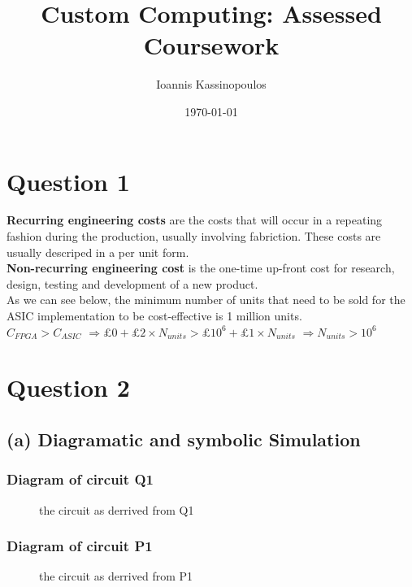 \documentclass[a4paper,10pt]{article}
\begin{document}
\title{Custom Computing: Assessed Coursework}
\author{Ioannis Kassinopoulos}
\date{\today}
\maketitle
\section*{Question 1}
\textbf{Recurring engineering costs} are the costs that will occur in a repeating fashion during the production, usually involving fabriction.
These costs are usually descriped in a per unit form.
\\[0.25cm]
\textbf{Non-recurring engineering cost} is the one-time up-front cost 
for research, design, testing and development of a new product.
\\[0.25cm]
As we can see below, the minimum number of units that need to be sold for the ASIC implementation to be cost-effective is 1 million units.
\\[0.25cm]
$C_{FPGA} > C_{ASIC}$
$\Rightarrow \pounds 0 + \pounds 2 \times N_{units} > \pounds 10^6 + \pounds 1 \times N_{units} $ 
$\Rightarrow N_{units} > 10^6$

\section*{Question 2}
\subsection*{(a) Diagramatic and symbolic Simulation}
\subsubsection*{Diagram of circuit Q1}
\begin{figure}[!h]
\begin{center}

\caption{the circuit as derrived from Q1}
\end{center}
\end{figure}
\subsubsection*{Diagram of circuit P1}
\begin{figure}[!h]
\begin{center}

\caption{the circuit as derrived from P1}
\end{center}
\end{figure}
\end{document}
